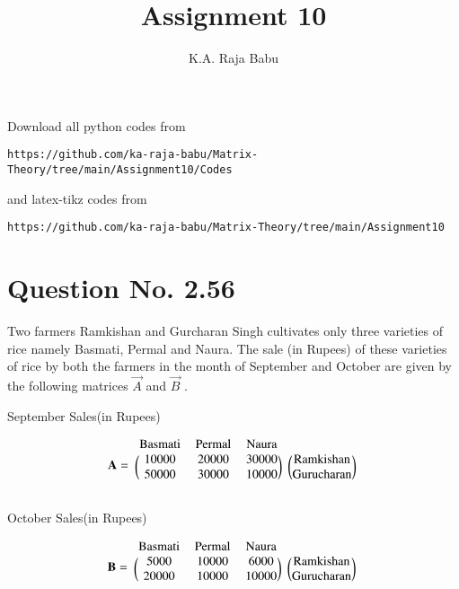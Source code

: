 \documentclass[journal,12pt,twocolumn]{IEEEtran}
\begin{document}
     \def\rightbox#1{\makebox[0in][r]{#1}}
     \def\centbox#1{\makebox[0in]{#1}}
     \def\topbox#1{\raisebox{-\baselineskip}[0in][0in]{#1}}
     \def\midbox#1{\raisebox{-0.5\baselineskip}[0in][0in]{#1}}
\vspace{3cm}
\title{Assignment 10}
\author{K.A. Raja Babu}
\maketitle
\newpage
\bigskip
\renewcommand{\thefigure}{\theenumi}
\renewcommand{\thetable}{\theenumi}
Download all python codes from 
\begin{lstlisting}
https://github.com/ka-raja-babu/Matrix-Theory/tree/main/Assignment10/Codes
\end{lstlisting}
%
and latex-tikz codes from 
%
\begin{lstlisting}
https://github.com/ka-raja-babu/Matrix-Theory/tree/main/Assignment10
\end{lstlisting}
%
\section{Question No. 2.56}
Two farmers Ramkishan and Gurcharan Singh cultivates only three varieties of rice namely Basmati, Permal and Naura. The sale (in Rupees) of these varieties of rice by both the farmers in the month of September and October are given by the following matrices $\vec{A}$ and $\vec{B}$ .

\begin{center}
September Sales(in Rupees)
\end{center}
\begin{align}
    \vec{A}=
    \begin{blockarray}{cccc}
    \text{Basmati} & \text{Permal} & \text{Naura} \\
    \begin{block}{(ccc)(c)}
    10000 & 20000 & 30000 & \text{Ramkishan}\\
    50000 & 30000 & 10000 & \text{Gurucharan} \\
    \end{block}
    \end{blockarray}
\end{align}

\begin{center}
October Sales(in Rupees)
\end{center}
\begin{align}
    \vec{B} =
    \begin{blockarray}{cccc}
    \text{Basmati} & \text{Permal} & \text{Naura} \\
    \begin{block}{(ccc)(c)}
    5000 & 10000 & 6000 & \text{Ramkishan}\\
    20000 & 10000 & 10000 & \text{Gurucharan} \\
    \end{block}
    \end{blockarray}
\end{align}
\end{document}
